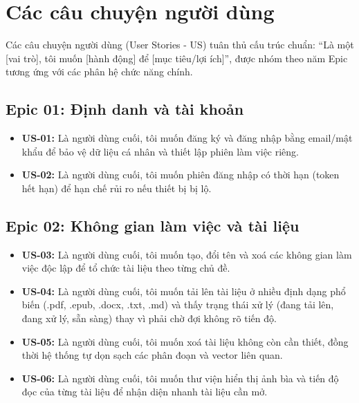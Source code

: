 \section{Các câu chuyện người dùng}
Các câu chuyện người dùng (User Stories - US) tuân thủ cấu trúc chuẩn: ``Là một [vai trò], tôi muốn [hành động] để [mục tiêu/lợi ích]'', được nhóm theo năm Epic tương ứng với các phân hệ chức năng chính.

\subsection{Epic 01: Định danh và tài khoản}
\begin{itemize}
    \item \textbf{US-01:} Là người dùng cuối, tôi muốn đăng ký và đăng nhập bằng email/mật khẩu để bảo vệ dữ liệu cá nhân và thiết lập phiên làm việc riêng.
    \item \textbf{US-02:} Là người dùng cuối, tôi muốn phiên đăng nhập có thời hạn (token hết hạn) để hạn chế rủi ro nếu thiết bị bị lộ.
\end{itemize}

\subsection{Epic 02: Không gian làm việc và tài liệu}
\begin{itemize}
    \item \textbf{US-03:} Là người dùng cuối, tôi muốn tạo, đổi tên và xoá các không gian làm việc độc lập để tổ chức tài liệu theo từng chủ đề.
    \item \textbf{US-04:} Là người dùng cuối, tôi muốn tải lên tài liệu ở nhiều định dạng phổ biến (.pdf, .epub, .docx, .txt, .md) và thấy trạng thái xử lý (đang tải lên, đang xử lý, sẵn sàng) thay vì phải chờ đợi không rõ tiến độ.
    \item \textbf{US-05:} Là người dùng cuối, tôi muốn xoá tài liệu không còn cần thiết, đồng thời hệ thống tự dọn sạch các phân đoạn và vector liên quan.
    \item \textbf{US-06:} Là người dùng cuối, tôi muốn thư viện hiển thị ảnh bìa và tiến độ đọc của từng tài liệu để nhận diện nhanh tài liệu cần mở.
\end{itemize}

